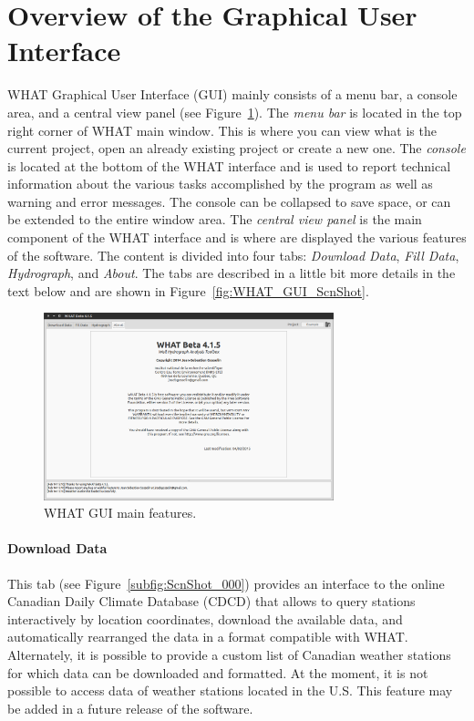 \documentclass[12pt, letterpaper, fleqn]{report}
\begin{document}
\section{Overview of the Graphical User Interface}


WHAT Graphical User Interface (GUI) mainly consists of a menu bar, a console area, and a central view panel (see Figure~\ref{fig:WHAT_GUI}). The \emph{menu bar} is located in the top right corner of WHAT main window. This is where you can view what is the current project, open an already existing project or create a new one. The \emph{console} is located at the bottom of the WHAT interface and is used to report technical information about the various tasks accomplished by the program as well as warning and error messages. The console can be collapsed to save space, or can be extended to the entire window area. The \emph{central view panel} is the main component of the WHAT interface and is where are displayed the various features of the software. The content is divided into four tabs: \emph{Download Data}, \emph{Fill Data}, \emph{Hydrograph}, and \emph{About}. The tabs are described in a little bit more details in the text below and are shown in Figure~\ref{fig:WHAT_GUI_ScnShot}.

\begin{figure}[h!]
\centering
\includegraphics[width=0.75\textwidth]{WHAT_GUI}
\caption[WHAT GUI main features.]{WHAT GUI main features.}
\label{fig:WHAT_GUI}
\end{figure}

\paragraph{Download Data} This tab (see Figure~\ref{subfig:ScnShot_000}) provides an interface to the online Canadian Daily Climate Database (CDCD) that allows to query stations interactively by location coordinates, download the available data, and automatically rearranged the data in a format compatible with WHAT. Alternately, it is possible to provide a custom list of Canadian weather stations for which data can be downloaded and formatted. At the moment, it is not possible to access data of weather stations located in the U.S. This feature may be added in a future release of the software.
\end{document}
